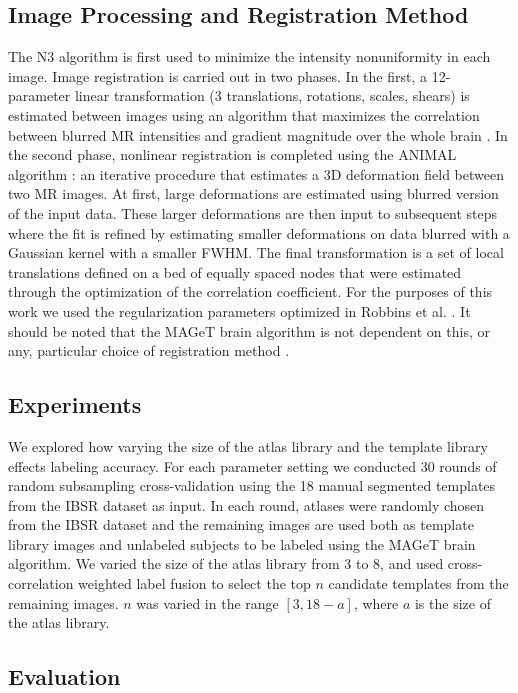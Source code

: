 \documentclass{article}\usepackage[]{graphicx}\usepackage[]{color}
\begin{document}
\subsection{Image Processing and Registration Method}
The N3 algorithm \citep{Sled1998} is first used to minimize the intensity
nonuniformity in each image.  Image registration is carried out in two phases.
In the first, a 12-parameter linear transformation (3 translations, rotations,
scales, shears) is estimated between images using an algorithm that maximizes
the correlation between blurred MR intensities and gradient magnitude over the
whole brain \citep{Collins}.  In the second phase, nonlinear registration is
completed using the ANIMAL algorithm \citep{Collins1995}: an iterative procedure
that estimates a 3D deformation field between two MR images. At first, large
deformations are estimated using blurred version of the input data. These
larger deformations are then input to subsequent steps where the fit is refined
by estimating smaller deformations on data blurred with a Gaussian kernel with
a smaller FWHM. The final transformation is a set of local translations defined
on a bed of equally spaced nodes that were estimated through the optimization
of the correlation coefficient. For the purposes of this work we used the
regularization parameters optimized in Robbins et al. \citep{Robbins2004}. It
should be noted that the MAGeT brain algorithm is not dependent on this, or
any, particular choice of registration method \citep{Chakravarty2012}.

\subsection{Experiments}

We explored how varying the size of the atlas library and the template library
effects labeling accuracy.  For each parameter setting we conducted 30 rounds
of random subsampling cross-validation using the 18 manual segmented templates
from the IBSR dataset as input. In each round, atlases were randomly chosen
from the IBSR dataset and the remaining images are used both as template
library images and unlabeled subjects to be labeled using the MAGeT brain
algorithm.  We varied the size of the atlas library from 3 to 8, and used
cross-correlation weighted label fusion to select the top $n$ candidate
templates from the remaining images.  $n$ was varied in the range $[3, 18-a]$,
where $a$ is the size of the atlas library.

\subsection{Evaluation}
\end{document}
